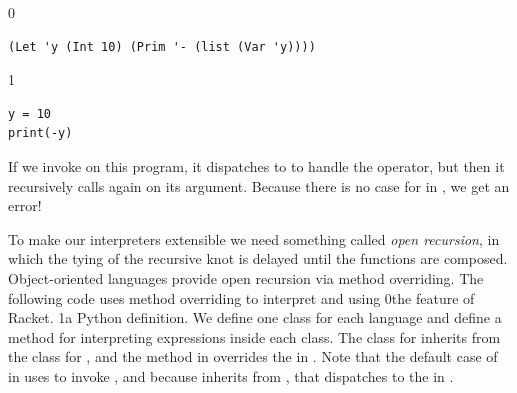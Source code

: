 \documentclass[7x10]{TimesAPriori_MIT}%
\def\racketEd{0}
\def\pythonEd{1}
\def\edition{1}
\newcommand{\racket}[1]{{\if\edition\racketEd{#1}\fi}}
\newcommand{\pythonColor}[0]{}
\newcommand{\python}[1]{{\if\edition\pythonEd\pythonColor #1\fi}}
\numberwithin{theorem}{chapter}
\numberwithin{definition}{chapter}
\numberwithin{equation}{chapter}
\begin{document}
{\if\edition\racketEd
\begin{lstlisting}
(Let 'y (Int 10) (Prim '- (list (Var 'y))))
\end{lstlisting}
\fi}
{\if\edition\pythonEd\pythonColor
\begin{minipage}{0.96\textwidth}
\begin{lstlisting}
y = 10 
print(-y)
\end{lstlisting}
\end{minipage}
\fi}

\noindent If we invoke  on this program, it
dispatches to  to handle the \code{-} operator, but
then it recursively calls  again on its argument.
Because there is no case for  in , we get
an error!

To make our interpreters extensible we need something called
\emph{open recursion}, in which the
tying of the recursive knot is delayed until the functions are
composed. Object-oriented languages provide open recursion via method
overriding. The following code uses
method overriding to interpret \LangInt{} and \LangVar{} using
%
\racket{the
  \href{https://docs.racket-lang.org/guide/classes.html}{\code{class}}
  \index{subject}{class} feature of Racket.}%
%
\python{a Python  definition.}
%
We define one class for each language and define a method for
interpreting expressions inside each class. The class for \LangVar{}
inherits from the class for \LangInt{}, and the method
 in \LangVar{} overrides the  in
\LangInt{}. Note that the default case of  in
\LangVar{} uses  to invoke , and because
\LangVar{} inherits from \LangInt{}, that dispatches to the
 in \LangInt{}.
\end{document}
